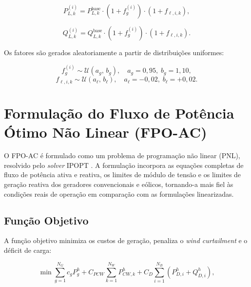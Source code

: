 \documentclass[conference]{IEEEtran}
\begin{document}
\begin{equation}
P_{L,k}^{(i)} = P_{L,k}^{\text{base}}
    \cdot \left(1 + f_{g}^{(i)}\right)
    \cdot \left(1 + f_{\ell,i,k}\right),
\label{eq:PLOAD}
\end{equation}

\begin{equation}
Q_{L,k}^{(i)} = Q_{L,k}^{\text{base}}
    \cdot \left(1 + f_{g}^{(i)}\right)
    \cdot \left(1 + f_{\ell,i,k}\right).
\label{eq:QLOAD}
\end{equation}

Os fatores são gerados aleatoriamente a partir de distribuições uniformes:

\begin{equation}
f_{g}^{(i)} \sim \mathcal{U}(a_g,\, b_g),
\quad a_g = 0{,}95,\; b_g = 1{,}10,
\label{eq:fg}
\end{equation}
\begin{equation}
f_{\ell,i,k} \sim \mathcal{U}(a_\ell,\, b_\ell),
\quad a_\ell = -0{,}02,\; b_\ell = +0{,}02.
\label{eq:fl}
\end{equation}

\section{Formulação do Fluxo de Potência Ótimo Não Linear (FPO-AC)}
\label{sec:fpo_ac}

O FPO-AC é formulado como um problema de programação não linear (PNL),
resolvido pelo \textit{solver} IPOPT \cite{wachter2006ipopt}. A formulação incorpora as equações completas de fluxo de potência ativa e reativa, os limites de módulo de tensão e os limites de geração reativa dos geradores convencionais
e eólicos, tornando-a mais fiel às condições reais de operação em comparação
com as formulações linearizadas.

\subsection{Função Objetivo}

A função objetivo minimiza os custos de geração, penaliza o
\textit{wind curtailment} e o déficit de carga:

\begin{equation}
\min
    \sum_{g=1}^{N_G} c_g P_{g}^{h}
    + C_{PCW} \sum_{k=1}^{N_W} P_{CW,k}^{h}
    + C_{D} \sum_{i=1}^{N_B} \left(P_{D,i}^{h} + Q_{D,i}^{h}\right),
\label{eq:fob}
\end{equation}
\end{document}
